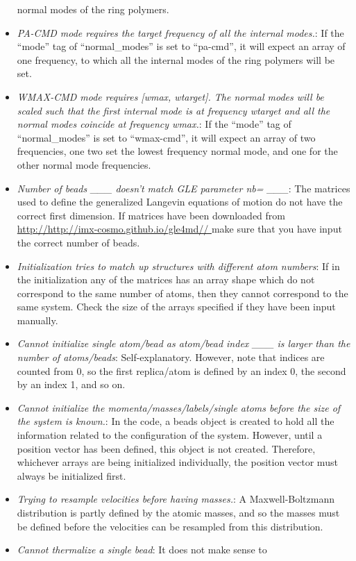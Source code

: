 \documentclass[11pt,english,fleqn]{report}
\begin{document}
\begin{itemize}
normal modes of the ring polymers.
\item \emph{PA-CMD mode requires the target frequency of all the internal modes.}:
If the {}``mode'' tag of {}``normal\_modes'' is set to {}``pa-cmd'',
it will expect an array of one frequency, to which all the internal
modes of the ring polymers will be set.
\item \emph{WMAX-CMD mode requires [wmax, wtarget]. The normal modes will be scaled such that the first internal mode is at frequency wtarget and all the normal modes coincide at frequency wmax.}:
If the {}``mode'' tag of {}``normal\_modes'' is set to {}``wmax-cmd'',
it will expect an array of two frequencies, one two set the lowest
frequency normal mode, and one for the other normal mode frequencies.
\item \emph{Number of beads \_\_\_ doesn't match GLE parameter nb= \_\_\_}:
The matrices used to define the generalized Langevin equations of
motion do not have the correct first dimension. If matrices have been
downloaded from \url{http://http://imx-cosmo.github.io/gle4md// } make sure that you
have input the correct number of beads.
\item \emph{Initialization tries to match up structures with different atom numbers}:
If in the initialization any of the matrices has an array shape which
do not correspond to the same number of atoms, then they cannot correspond
to the same system. Check the size of the arrays specified if they
have been input manually.
\item \emph{Cannot initialize single atom/bead as atom/bead index \_\_\_ is larger than the number of atoms/beads}:
Self-explanatory. However, note that indices are counted from 0, so
the first replica/atom is defined by an index 0, the second by an
index 1, and so on.
\item \emph{Cannot initialize the momenta/masses/labels/single atoms before the size of the system is known.}:
In the code, a beads object is created to hold all the information
related to the configuration of the system. However, until a position
vector has been defined, this object is not created. Therefore, whichever
arrays are being initialized individually, the position vector must
always be initialized first.
\item \emph{Trying to resample velocities before having masses.}: A Maxwell-Boltzmann
distribution is partly defined by the atomic masses, and so the masses
must be defined before the velocities can be resampled from this distribution.
\item \emph{Cannot thermalize a single bead}: It does not make sense to

\end{itemize}
\end{document}
